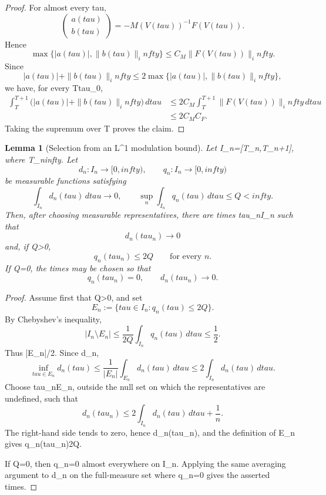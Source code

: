 \documentclass[11pt]{amsart}
\def\({}%
\def\){}%
\def\tau{tau}%
\def\infty{infty}%
\theoremstyle{plain}
\newtheorem{lemma}[lemma]{Lemma}
\theoremstyle{definition}
\theoremstyle{remark}
\begin{document}
\begin{proof}
For almost every \(\tau\),
\[
  \begin{pmatrix}
  a(\tau)\\ b(\tau)
  \end{pmatrix}
  =
  -M(V(\tau))^{-1}F(V(\tau)).
\]
Hence
\[
  \max\{|a(\tau)|,\|b(\tau)\|_\infty\}
  \le C_M\|F(V(\tau))\|_\infty.
\]
Since
\[
  |a(\tau)|+\|b(\tau)\|_\infty
  \le
  2\max\{|a(\tau)|,\|b(\tau)\|_\infty\},
\]
we have, for every \(T\ge\tau_0\),
\[
\begin{aligned}
  \int_T^{T+1}\bigl(|a(\tau)|+\|b(\tau)\|_\infty\bigr)\,d\tau
  &\le
  2C_M\int_T^{T+1}\|F(V(\tau))\|_\infty\,d\tau  \\
  &\le 2C_MC_F .
\end{aligned}
\]
Taking the supremum over \(T\) proves the claim.
\end{proof}

\begin{lemma}[Selection from an \(L^1\) modulation bound]
\label{paper7:lem:unit-window-selection}
Let \(I_n=[T_n,T_n+1]\), where \(T_n\to\infty\).  Let
\[
  d_n:I_n\to[0,\infty),\qquad q_n:I_n\to[0,\infty)
\]
be measurable functions satisfying
\[
  \int_{I_n}d_n(\tau)\,d\tau\to0,
  \qquad
  \sup_n\int_{I_n}q_n(\tau)\,d\tau\le Q<\infty .
\]
Then, after choosing measurable representatives, there are times
\(\tau_n\in I_n\) such that
\[
  d_n(\tau_n)\to0
\]
and, if \(Q>0\),
\[
  q_n(\tau_n)\le2Q
  \qquad\text{for every }n.
\]
If \(Q=0\), the times may be chosen so that
\[
  q_n(\tau_n)=0,\qquad d_n(\tau_n)\to0.
\]
\end{lemma}

\begin{proof}
Assume first that \(Q>0\), and set
\[
  E_n:=\{\tau\in I_n:q_n(\tau)\le2Q\}.
\]
By Chebyshev's inequality,
\[
  |I_n\setminus E_n|
  \le
  \frac{1}{2Q}\int_{I_n}q_n(\tau)\,d\tau
  \le \frac12.
\]
Thus \(|E_n|/2\).  Since \(d_n\),
\[
  \inf_{\tau\in E_n}d_n(\tau)
  \le
  \frac{1}{|E_n|}\int_{E_n}d_n(\tau)\,d\tau
  \le
  2\int_{I_n}d_n(\tau)\,d\tau.
\]
Choose \(\tau_n\in E_n\), outside the null set on which the representatives
are undefined, such that
\[
  d_n(\tau_n)
  \le
  2\int_{I_n}d_n(\tau)\,d\tau+\frac1n.
\]
The right-hand side tends to zero, hence \(d_n(\tau_n)\), and the
definition of \(E_n\) gives \(q_n(\tau_n)\le2Q\).

If \(Q=0\), then \(q_n=0\) almost everywhere on \(I_n\).  Applying the same
averaging argument to \(d_n\) on the full-measure set where \(q_n=0\) gives
the asserted times.
\end{proof}
\end{document}
